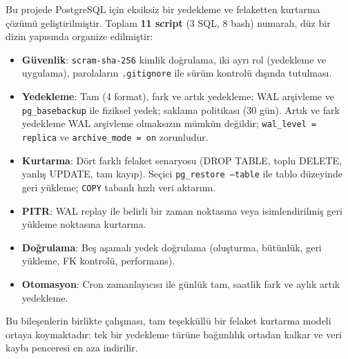 \documentclass[12pt, a4paper]{report}
\begin{document}
Bu projede PostgreSQL için eksiksiz bir yedekleme ve felaketten kurtarma çözümü geliştirilmiştir. Toplam \textbf{11 script} (3 SQL, 8 bash) numaralı, düz bir dizin yapısında organize edilmiştir:

\begin{itemize}
  \item \textbf{Güvenlik}: \texttt{scram-sha-256} kimlik doğrulama, iki ayrı rol (yedekleme ve uygulama), parolaların \texttt{.gitignore} ile sürüm kontrolü dışında tutulması.
  \item \textbf{Yedekleme}: Tam (4 format), fark ve artık yedekleme; WAL arşivleme ve \texttt{pg\_basebackup} ile fiziksel yedek; saklama politikası (30 gün). Artık ve fark yedekleme WAL arşivleme olmaksızın mümkün değildir; \texttt{wal\_level = replica} ve \texttt{archive\_mode = on} zorunludur.
  \item \textbf{Kurtarma}: Dört farklı felaket senaryosu (DROP TABLE, toplu DELETE, yanlış UPDATE, tam kayıp). Seçici \texttt{pg\_restore --table} ile tablo düzeyinde geri yükleme; \texttt{COPY} tabanlı hızlı veri aktarımı.
  \item \textbf{PITR}: WAL replay ile belirli bir zaman noktasına veya isimlendirilmiş geri yükleme noktasına kurtarma.
  \item \textbf{Doğrulama}: Beş aşamalı yedek doğrulama (oluşturma, bütünlük, geri yükleme, FK kontrolü, performans).
  \item \textbf{Otomasyon}: Cron zamanlayıcısı ile günlük tam, saatlik fark ve aylık artık yedekleme.
\end{itemize}

Bu bileşenlerin birlikte çalışması, tam teşekküllü bir felaket kurtarma modeli ortaya koymaktadır: tek bir yedekleme türüne bağımlılık ortadan kalkar ve veri kaybı penceresi en aza indirilir.
\end{document}
